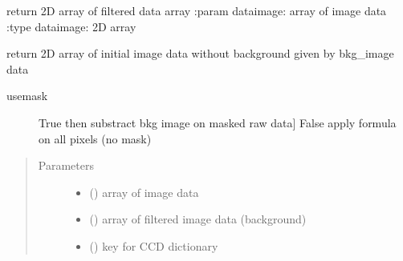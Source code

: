 \documentclass[letterpaper,10pt,english]{sphinxmanual}
\begin{document}

\begin{fulllineitems}
\label{\detokenize{PeakSearch:LaueTools.readmccd.compute_autobackground_image}}
return 2D array of filtered data array
:param dataimage: array of image data
:type dataimage: 2D array

\end{fulllineitems}


\begin{fulllineitems}
\label{\detokenize{PeakSearch:LaueTools.readmccd.computefilteredimage}}
return 2D array of initial image data without background given by bkg\_image data
\begin{description}
\item[{usemask}] \leavevmode{[}True  then substract bkg image on masked raw data{]}
False  apply formula on all pixels (no mask)

\end{description}
\begin{quote}\begin{description}
\item[{Parameters}] \leavevmode\begin{itemize}
\item {} 
 () \textendash{} array of image data

\item {} 
 () \textendash{} array of filtered image data (background)

\item {} 
 () \textendash{} key for CCD dictionary

\end{itemize}

\end{description}\end{quote}

\end{fulllineitems}
\end{document}

